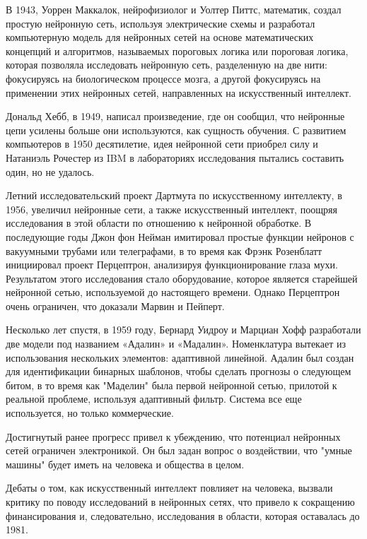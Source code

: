 В 1943, Уоррен Маккалок, нейрофизиолог и Уолтер Питтс, математик, создал простую нейронную сеть, используя электрические схемы и
разработал компьютерную модель для нейронных сетей на основе математических концепций и алгоритмов,
называемых пороговых логика или пороговая логика,
которая позволяла исследовать нейронную сеть, разделенную на две нити: фокусируясь на биологическом процессе мозга,
а другой фокусируясь на применении этих нейронных сетей, направленных на искусственный интеллект.

Дональд Хебб, в 1949, написал произведение, где он сообщил, что нейронные цепи усилены больше они используются,
как сущность обучения. С развитием компьютеров в 1950 десятилетие, идея нейронной сети приобрел силу и Натаниэль Рочестер
из IBM в лабораториях исследования пытались составить один, но не удалось.

Летний исследовательский проект Дартмута по искусственному интеллекту, в 1956,
увеличил нейронные сети, а также искусственный интеллект,
поощряя исследования в этой области по отношению к нейронной обработке.
В последующие годы Джон фон Нейман имитировал простые функции нейронов с вакуумными трубами или телеграфами,
в то время как Фрэнк Розенблатт инициировал проект Перцептрон, анализируя функционирование глаза мухи.
Результатом этого исследования стало оборудование,
которое является старейшей нейронной сетью, используемой до настоящего времени.
Однако Перцептрон очень ограничен, что доказали Марвин и Пейперт.


Несколько лет спустя, в 1959 году, Бернард Уидроу и Марциан Хофф
разработали две модели под названием «Адалин» и «Мадалин».
Номенклатура вытекает из использования нескольких элементов: адаптивной линейной.
Адалин был создан для идентификации бинарных шаблонов,
чтобы сделать прогнозы о следующем битом,
в то время как "Маделин" была первой нейронной сетью,
прилотой к реальной проблеме, используя адаптивный фильтр.
Система все еще используется, но только коммерческие.

Достигнутый ранее прогресс привел к убеждению,
что потенциал нейронных сетей ограничен электроникой.
Он был задан вопрос о воздействии,
что "умные машины" будет иметь на человека и общества в целом.

Дебаты о том, как искусственный интеллект повлияет на человека,
вызвали критику по поводу исследований в нейронных сетях,
что привело к сокращению финансирования и, следовательно,
исследования в области, которая оставалась до 1981.

